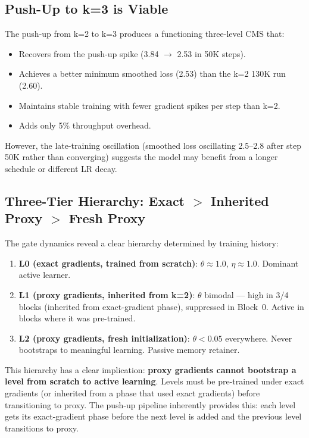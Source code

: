 \documentclass[11pt,a4paper]{article}
\begin{document}
\subsection{Push-Up to k=3 is Viable}

The push-up from k=2 to k=3 produces a functioning three-level CMS that:
\begin{itemize}
    \item Recovers from the push-up spike (3.84 $\to$ 2.53 in 50K steps).
    \item Achieves a better minimum smoothed loss (2.53) than the k=2 130K run (2.60).
    \item Maintains stable training with fewer gradient spikes per step than k=2.
    \item Adds only 5\% throughput overhead.
\end{itemize}

\noindent However, the late-training oscillation (smoothed loss oscillating 2.5--2.8 after step 50K
rather than converging) suggests the model may benefit from a longer schedule or different LR decay.

\subsection{Three-Tier Hierarchy: Exact $>$ Inherited Proxy $>$ Fresh Proxy}

The gate dynamics reveal a clear hierarchy determined by training history:
\begin{enumerate}
    \item \textbf{L0 (exact gradients, trained from scratch)}: $\theta\approx 1.0$, $\eta\approx 1.0$. Dominant active learner.
    \item \textbf{L1 (proxy gradients, inherited from k=2)}: $\theta$ bimodal --- high in 3/4 blocks (inherited from exact-gradient phase), suppressed in Block~0. Active in blocks where it was pre-trained.
    \item \textbf{L2 (proxy gradients, fresh initialization)}: $\theta < 0.05$ everywhere. Never bootstraps to meaningful learning. Passive memory retainer.
\end{enumerate}

\noindent This hierarchy has a clear implication: \textbf{proxy gradients cannot bootstrap a level from
scratch to active learning}. Levels must be pre-trained under exact gradients (or inherited from
a phase that used exact gradients) before transitioning to proxy. The push-up pipeline inherently
provides this: each level gets its exact-gradient phase before the next level is added and the
previous level transitions to proxy.
\end{document}

